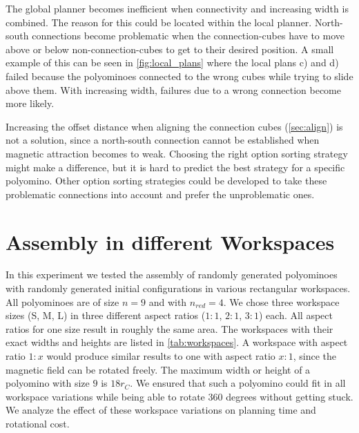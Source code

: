 The global planner becomes inefficient when connectivity and increasing width is combined.
The reason for this could be located within the local planner.
North-south connections become problematic when the connection-cubes have to move above or below non-connection-cubes to get to their desired position.
A small example of this can be seen in \autoref{fig:local_plans} where the local plans c) and d) failed because the polyominoes connected to the wrong cubes while trying to slide above them.
With increasing width, failures due to a wrong connection become more likely.

Increasing the offset distance when aligning the connection cubes (\autoref{sec:align}) is not a solution, since a north-south connection cannot be established when magnetic attraction becomes to weak.
Choosing the right option sorting strategy might make a difference, but it is hard to predict the best strategy for a specific polyomino.
Other option sorting strategies could be developed to take these problematic connections into account and prefer the unproblematic ones.



\section{Assembly in different Workspaces}
\label{sec:AFBS}

In this experiment we tested the assembly of randomly generated polyominoes with randomly generated initial configurations in various rectangular workspaces.
All polyominoes are of size $n=9$ and with $n_\textit{red} = 4$.
We chose three workspace sizes (S, M, L) in three different aspect ratios ($ 1:1 $, $ 2:1 $, $ 3:1 $) each.
All aspect ratios for one size result in roughly the same area. The workspaces with their exact widths and heights are listed in \autoref{tab:workspaces}.
A workspace with aspect ratio $ 1:x $ would produce similar results to one with aspect ratio $ x:1 $, since the magnetic field can be rotated freely.
The maximum width or height of a polyomino with size $9$ is $18 r_C$.
We ensured that such a polyomino could fit in all workspace variations while being able to rotate $360$ degrees without getting stuck.
We analyze the effect of these workspace variations on planning time and rotational cost.

